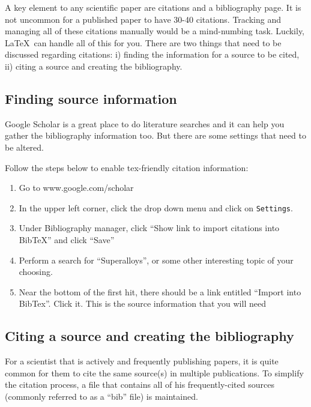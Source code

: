A key element to any scientific paper are citations and a
bibliography page.  It is not uncommon for a published paper to have 30-40
citations.  Tracking and managing all of these citations manually
would be a mind-numbing task. Luckily, \LaTeX ~can handle all of this
for you.  There are two things that need to be discussed regarding
citations: i) finding the information for a source to be cited, ii)
citing a source and creating the bibliography.\\

\subsection*{Finding source information}
Google Scholar is a great place to do literature searches and it can
help you gather the bibliography information too.  But there are some
settings that need to be altered.
\begin{enumerate}
\probtwo  Follow the steps below to enable tex-friendly citation
information:
\begin{enumerate}
\item Go to www.google.com/scholar
\item In the upper left corner, click the drop down menu and click on
  \verb!Settings!.
\item Under Bibliography manager, click ``Show link to import
  citations into BibTeX'' and click ``Save''
\item Perform a search for ``Superalloys'', or some other interesting
  topic of your choosing.
\item Near the bottom of the first hit, there should be a link
  entitled ``Import into BibTex''.  Click it.  This is the source
  information that you will need
\end{enumerate}
\end{enumerate}
\subsection*{Citing a source and creating the bibliography}
For a scientist that is actively and frequently publishing papers, it
is quite common for them to cite the same source(s) in multiple
publications.  To simplify the citation process, a file that contains
all of his frequently-cited sources (commonly referred to as a ``bib''
file) is maintained.  

